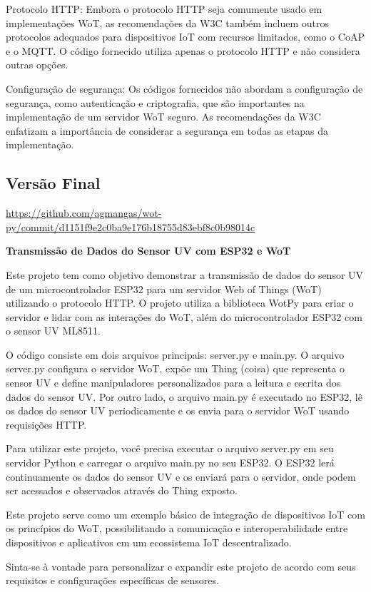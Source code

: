 Protocolo HTTP: Embora o protocolo HTTP seja comumente usado em implementações WoT, as recomendações da W3C também incluem outros protocolos adequados para dispositivos IoT com recursos limitados, como o CoAP e o MQTT. O código fornecido utiliza apenas o protocolo HTTP e não considera outras opções.

Configuração de segurança: Os códigos fornecidos não abordam a configuração de segurança, como autenticação e criptografia, que são importantes na implementação de um servidor WoT seguro. As recomendações da W3C enfatizam a importância de considerar a segurança em todas as etapas da implementação.

\subsection{Versão Final}

\url{https://github.com/agmangas/wot-py/commit/d1151f9e2c0ba9e176b18755d83ebf8c0b98014c}

\textbf{Transmissão de Dados do Sensor UV com ESP32 e WoT}

Este projeto tem como objetivo demonstrar a transmissão de dados do sensor UV de um microcontrolador ESP32 para um servidor Web of Things (WoT) utilizando o protocolo HTTP. O projeto utiliza a biblioteca WotPy para criar o servidor e lidar com as interações do WoT, além do microcontrolador ESP32 com o sensor UV ML8511.

O código consiste em dois arquivos principais: server.py e main.py. O arquivo server.py configura o servidor WoT, expõe um Thing (coisa) que representa o sensor UV e define manipuladores personalizados para a leitura e escrita dos dados do sensor UV. Por outro lado, o arquivo main.py é executado no ESP32, lê os dados do sensor UV periodicamente e os envia para o servidor WoT usando requisições HTTP.

Para utilizar este projeto, você precisa executar o arquivo server.py em seu servidor Python e carregar o arquivo main.py no seu ESP32. O ESP32 lerá continuamente os dados do sensor UV e os enviará para o servidor, onde podem ser acessados e observados através do Thing exposto.

Este projeto serve como um exemplo básico de integração de dispositivos IoT com os princípios do WoT, possibilitando a comunicação e interoperabilidade entre dispositivos e aplicativos em um ecossistema IoT descentralizado.

Sinta-se à vontade para personalizar e expandir este projeto de acordo com seus requisitos e configurações específicas de sensores.

